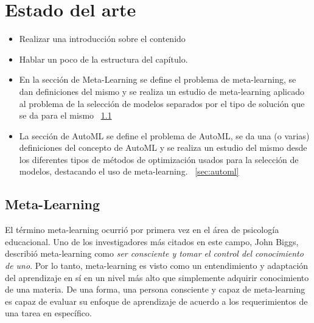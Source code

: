 \chapter{Estado del arte }\label{chapter:review}

 \begin{itemize}
 	\item Realizar una introducción sobre el contenido 
 	\item Hablar un poco de la estructura del capítulo.
 	 \item En la sección de Meta-Learning se define el problema de meta-learning, se dan definiciones del mismo y se realiza un estudio de meta-learning aplicado al problema de la selección de modelos separados por el tipo de solución que se da para el mismo ~\ref{sec:metalearning}
 	\item La sección de AutoML se define el problema de AutoML, se da una (o varias) definiciones del concepto de AutoML y se realiza un estudio del mismo desde los diferentes tipos de métodos de optimización usados para la selección de modelos, destacando el uso de meta-learning. ~\ref{sec:automl}
 \end{itemize}

\section{Meta-Learning}\label{sec:metalearning}


El término meta-learning ocurrió por primera vez en el área de psicología educacional. Uno de los investigadores más citados en este campo, John Biggs, describió meta-learning como \textit{ser consciente y tomar el control del conocimiento de uno}. Por lo tanto, meta-learning es visto como un entendimiento y adaptación del aprendizaje en sí en un nivel más alto que simplemente adquirir conocimiento de una materia. De una forma, una persona consciente y capaz de meta-learning es capaz de evaluar su enfoque de aprendizaje de acuerdo a los requerimientos de una tarea en específico.


